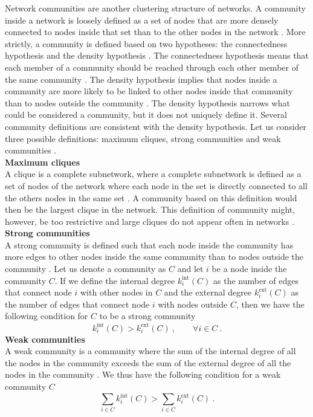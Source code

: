 \documentclass[11 pt , letterpaper , twoside , openright]{book}
\begin{document}
Network communities are another clustering structure of networks. A community inside a network is loosely defined as a set of nodes that are more densely connected to nodes inside that set than to the other nodes in the network \cite{Saha2015}. More strictly, a community is defined based on two hypotheses: the connectedness hypothesis and the density hypothesis \cite{Albert2016}. The connectedness hypothesis means that each member of a community should be reached through each other member of the same community \cite{Albert2016}. The density hypothesis implies that nodes inside a community are more likely to be linked to other nodes inside that community than to nodes outside the community \cite{Albert2016}. The density hypothesis narrows what could be considered a community, but it does not uniquely define it. Several community definitions are consistent with the density hypothesis. Let us consider three possible definitions: maximum cliques, strong communities and weak communities \cite{Albert2016}.\\
\newline
\textbf{Maximum cliques}\\
\newline
A clique is a complete subnetwork, where a complete subnetwork is defined as a set of nodes of the network where each node in the set is directly connected to all the others nodes in the same set \cite{Albert2016}. A community based on this definition would then be the largest clique in the network. This definition of community might, however, be too restrictive and large cliques do not appear often in networks \cite{Albert2016}.\\   
\newpage
\noindent
\textbf{Strong communities}\\
\newline
A strong community is defined such that each node inside the community has more edges to other nodes inside the same community than to nodes outside the community \cite{Albert2016}\cite{F.Costa2007}. Let us denote a community as $C$ and let $i$ be a node inside the community $C$. If we define the internal degree $k_i^{\textrm{int}}(C)$ as the number of edges that connect node $i$ with other nodes in $C$ and the external degree $k_i^{\textrm{ext}}(C)$ as the number of edges that connect node $i$ with nodes outside $C$, then we have the following condition for $C$ to be a strong community \cite{Albert2016}
\begin{equation}
	k_i^{\textrm{int}}(C) > k_i^{\textrm{ext}}(C) \ , \qquad \forall i \in C \ .
\end{equation}
\newline
\textbf{Weak communities}\\
\newline
A weak community is a community where the sum of the internal degree of all the nodes in the community exceeds the sum of the external degree of all the nodes in the community \cite{Albert2016}\cite{F.Costa2007}. We thus have the following condition for a weak community $C$ \cite{Albert2016}
\begin{equation}
	\sum_{i \in C} k_i^{\textrm{int}}(C) > \sum_{i \in C}k_i^{\textrm{ext}}(C) \ .
\end{equation}
\end{document}
